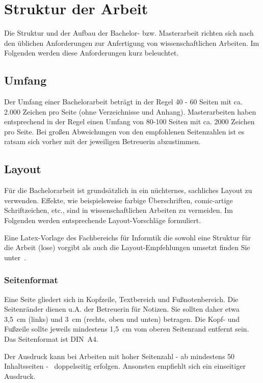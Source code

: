 \section{Struktur der Arbeit}\label{sec:structure}
%
Die Struktur und der Aufbau der Bachelor- bzw. Masterarbeit richten sich nach den üblichen Anforderungen zur Anfertigung von wissenschaftlichen Arbeiten. Im Folgenden werden diese Anforderungen kurz beleuchtet.

\subsection{Umfang}\label{sec:structure:scope}
%
Der Umfang einer Bachelorarbeit beträgt in der Regel 40 - 60 Seiten mit ca. 2.000 Zeichen pro Seite (ohne Verzeichnisse und Anhang). Masterarbeiten haben entsprechend in der Regel einen Umfang von 80-100 Seiten mit ca. 2000 Zeichen pro Seite. Bei großen Abweichungen von den empfohlenen Seitenzahlen ist es ratsam sich vorher mit der jeweiligen Betreuerin abzustimmen.

\subsection{Layout}\label{sec:structure:layout}
%
Für die Bachelorarbeit ist grundsätzlich in ein nüchternes, sachliches Layout zu verwenden. Effekte, wie beispielsweise farbige Überschriften, comic-artige Schriftzeichen, etc., sind in wissenschaftlichen Arbeiten zu vermeiden. Im Folgenden werden entsprechende Layout-Vorschläge formuliert.

Eine Latex-Vorlage des Fachbereichs für Informtik die sowohl eine Struktur für die Arbeit (lose) vorgibt als auch die Layout-Empfehlungen umsetzt finden Sie unter~\cite{}.

\subsubsection{Seitenformat}\label{sec:structure:layout:format}
%
Eine Seite gliedert sich in Kopfzeile, Textbereich und Fußnotenbereich. Die Seitenränder dienen u.A. der Betreuerin für Notizen. Sie sollten daher etwa 3,5~cm (links) und 3~cm (rechts, oben und unten) betragen. Die Kopf- und Fußzeile sollte jeweils mindestens 1,5~cm vom oberen Seitenrand entfernt sein. Das Seitenformat ist DIN~A4.
\smallskip

Der Ausdruck kann bei Arbeiten mit hoher Seitenzahl - ab mindestens 50 Inhaltsseiten -  doppelseitig erfolgen. Ansonsten empfiehlt sich ein einseitiger Ausdruck.

